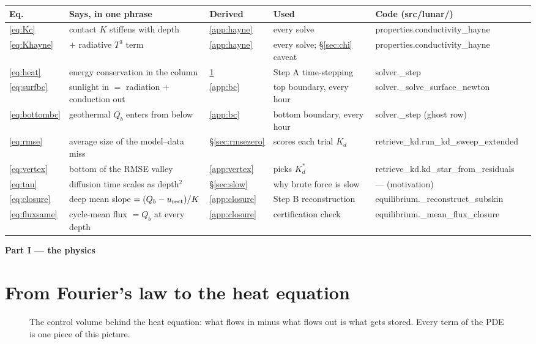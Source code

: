 \documentclass[11pt]{report}
\newcommand{\code}[1]{{\ttfamily\small #1}}
\begin{document}
\begin{center}\footnotesize
\begin{tabular}{@{}llllll@{}}
\toprule
Eq. & Says, in one phrase & Derived & Used & Code (\code{src/lunar/}) \\
\midrule
\eqref{eq:Kc} & contact $K$ stiffens with depth & \ref{app:hayne} & every solve & \code{properties.conductivity\_hayne} \\
\eqref{eq:Khayne} & $+$ radiative $T^3$ term & \ref{app:hayne} & every solve; \S\ref{sec:chi} caveat & \code{properties.conductivity\_hayne} \\
\eqref{eq:heat} & energy conservation in the column & \ref{app:heateq} & Step A time-stepping & \code{solver.\_step} \\
\eqref{eq:surfbc} & sunlight in $=$ radiation $+$ conduction out & \ref{app:bc} & top boundary, every hour & \code{solver.\_solve\_surface\_newton} \\
\eqref{eq:bottombc} & geothermal $Q_b$ enters from below & \ref{app:bc} & bottom boundary, every hour & \code{solver.\_step} (ghost row) \\
\eqref{eq:rmse} & average size of the model--data miss & \S\ref{sec:rmsezero} & scores each trial $K_d$ & \code{retrieve\_kd.run\_kd\_sweep\_extended} \\
\eqref{eq:vertex} & bottom of the RMSE valley & \ref{app:vertex} & picks $K_d^{*}$ & \code{retrieve\_kd.kd\_star\_from\_residuals} \\
\eqref{eq:tau} & diffusion time scales as depth$^2$ & \S\ref{sec:slow} & why brute force is slow & --- (motivation) \\
\eqref{eq:closure} & deep mean slope $=(Q_b-u_{\rm rect})/K$ & \ref{app:closure} & Step B reconstruction & \code{equilibrium.\_reconstruct\_subskin} \\
\eqref{eq:fluxsame} & cycle-mean flux $=Q_b$ at every depth & \ref{app:closure} & certification check & \code{equilibrium.\_mean\_flux\_closure} \\
\bottomrule
\end{tabular}
\end{center}

\bigskip
\noindent\textbf{\textsf{\color{forest} Part I --- the physics}}

\section{From Fourier's law to the heat equation}\label{app:heateq}

\begin{figure}[htbp]\centering

\caption{The control volume behind the heat equation: what flows in minus
what flows out is what gets stored. Every term of the PDE is one piece of
this picture.}
\label{fig:controlvolume}
\end{figure}
\end{document}
